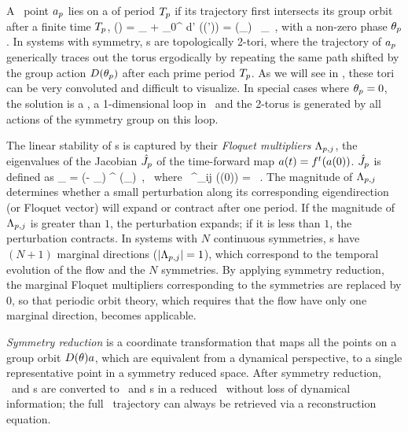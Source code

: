 A \statesp\ point $a_{p}$ lies on a \emph{\rpo} of period
${T_{p}}$ if its trajectory first intersects its group orbit after
a finite time ${T_{p}}$,
\beq
\ssp(\period{\rpprime})
    = \ssp_\rpprime
     + \int_0^\period{\rpprime} \!\!\!\!d\tau' \vel(\ssp (\tau'))
    = \matrixRep(\theta_\rpprime) \,  \ssp_\rpprime
  \,,
with a non-zero phase $\theta_{p}$. In systems with  symmetry, 
\rpo s are topologically 2-tori, where the trajectory of
$a_{p}$ generically traces out the torus ergodically by
repeating the same path shifted by the group action
${D}(\theta_{p})$ after each prime period
${T_{p}}$. As we will see in , these tori
can be very convoluted and difficult to visualize. In special cases where
$\theta_{p}=0$, the solution is a \po, a 1-dimensional loop in \statesp\ and
the 2-torus is generated by all actions of the symmetry group on this
loop.

The linear stability of \rpo s is captured by their \emph{Floquet
multipliers}  $\Lambda_{p,j}$, the eigenvalues of the Jacobian $\hat{{J}}_{p}$ 
of the  time-forward map $a(t)={f^{t}(a(0))}$. $\hat{{J}}_{p}$ is defined as
\beq
\jMpsRed_{\rpprime}
= \matrixRep(- \theta_\rpprime ) \jMps^\period{\rpprime} (\ssp_\rpprime)
\,, \; \mbox{~where~}\;
\jMps^{\zeit}_{ij} (\ssp(0)) = \, .
The magnitude of $\Lambda_{p,j}$ determines whether a small perturbation
along its corresponding eigendirection (or Floquet vector) will expand or
contract after one period. If the magnitude of $\Lambda_{p,j}$ is
greater than $1$, the perturbation expands; if it is less than $1$, the
perturbation contracts. In systems with $N$ continuous symmetries, \rpo s
have $(N+1)$ marginal directions ($\left|\Lambda_{p,j}\right| = 1$),
which correspond to the temporal evolution of the flow and the $N$
symmetries. By applying symmetry reduction, the marginal Floquet
multipliers corresponding to the symmetries are replaced by $0$, so that
periodic orbit theory, which requires that the flow have only one
marginal direction, becomes applicable.

\emph{Symmetry reduction} is a coordinate transformation that maps
all the points on a group orbit ${D}(\theta) a$, which are
equivalent from a dynamical perspective, to a single representative point
in a symmetry reduced space. After symmetry reduction, \reqva\ and \rpo s
are converted to \eqva\ and \po s in a
reduced \statesp\ without loss of dynamical information; the full \statesp\
trajectory can always be retrieved via a reconstruction equation.


